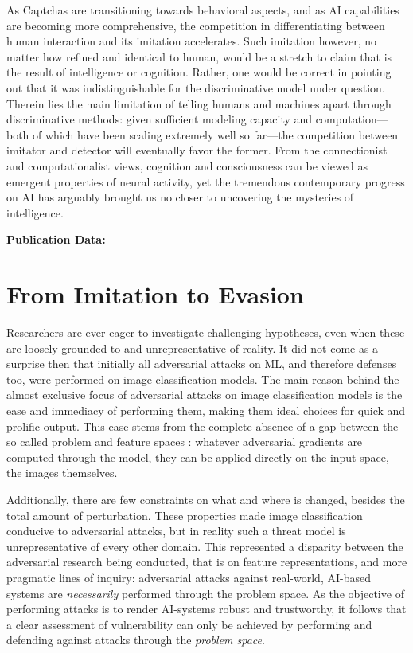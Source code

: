 As Captchas are transitioning towards behavioral aspects, and as AI capabilities are becoming more comprehensive, the competition in differentiating between human interaction and its imitation accelerates.
Such imitation however, no matter how refined and identical to human, would be a stretch to claim that is the result of intelligence or cognition.
Rather, one would be correct in pointing out that it was indistinguishable for the discriminative model under question.
Therein lies the main limitation of telling humans and machines apart through discriminative methods: given sufficient modeling capacity and computation---both of which have been scaling extremely well so far---the competition between imitator and detector will eventually favor the former.
From the connectionist and computationalist views, cognition and consciousness can be viewed as emergent properties of neural activity, yet the tremendous contemporary progress on \gls{AI} has arguably brought us no closer to uncovering the mysteries of intelligence.

\textbf{Publication Data:} 

\section{From Imitation to Evasion}

Researchers are ever eager to investigate challenging hypotheses, even when these are loosely grounded to and unrepresentative of reality.
It did not come as a surprise then that initially all adversarial attacks on \gls{ML}, and therefore defenses too, were performed on image classification models.
The main reason behind the almost exclusive focus of adversarial attacks on image classification models  is the ease and immediacy of performing them, making them ideal choices for quick and prolific output.
This ease stems from the complete absence of a gap between the so called problem and feature spaces \cite{pierazzi2020intriguing}: whatever adversarial gradients are computed through the model, they can be applied directly on the input space, the images themselves.

Additionally, there are few constraints on what and where is changed, besides the total amount of perturbation.
These properties made image classification conducive to adversarial attacks, but in reality such a threat model is unrepresentative of every other domain.
This represented a disparity between the adversarial research being conducted, that is on feature representations, and more pragmatic lines of inquiry:
adversarial attacks against real-world, AI-based systems are \textit{necessarily} performed through the problem space.
As the objective of performing attacks is to render AI-systems robust and trustworthy, it follows that a clear assessment of vulnerability can only be achieved by performing and defending against attacks through the \textit{problem space}.

